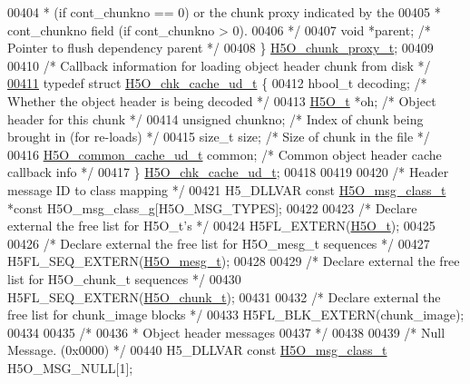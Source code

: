\begin{DoxyCode}
00404 \textcolor{comment}{     * (if cont\_chunkno == 0) or the chunk proxy indicated by the }
00405 \textcolor{comment}{     * cont\_chunkno field (if cont\_chunkno > 0).}
00406 \textcolor{comment}{     */}
00407     \textcolor{keywordtype}{void} *parent;                       \textcolor{comment}{/* Pointer to flush dependency parent */}
00408 \} \hyperlink{struct_h5_o__chunk__proxy__t}{H5O\_chunk\_proxy\_t};
00409 
00410 \textcolor{comment}{/* Callback information for loading object header chunk from disk */}
\hyperlink{struct_h5_o__chk__cache__ud__t}{00411} \textcolor{keyword}{typedef} \textcolor{keyword}{struct }\hyperlink{struct_h5_o__chk__cache__ud__t}{H5O\_chk\_cache\_ud\_t} \{
00412     hbool\_t decoding;                   \textcolor{comment}{/* Whether the object header is being decoded */}
00413     \hyperlink{struct_h5_o__t}{H5O\_t} *oh;                          \textcolor{comment}{/* Object header for this chunk */}
00414     \textcolor{keywordtype}{unsigned} chunkno;                   \textcolor{comment}{/* Index of chunk being brought in (for re-loads) */}
00415     \textcolor{keywordtype}{size\_t} size;                        \textcolor{comment}{/* Size of chunk in the file */}
00416     \hyperlink{struct_h5_o__common__cache__ud__t}{H5O\_common\_cache\_ud\_t} common;       \textcolor{comment}{/* Common object header cache callback info */}
00417 \} \hyperlink{struct_h5_o__chk__cache__ud__t}{H5O\_chk\_cache\_ud\_t};
00418 
00419 
00420 \textcolor{comment}{/* Header message ID to class mapping */}
00421 H5\_DLLVAR \textcolor{keyword}{const} \hyperlink{struct_h5_o__msg__class__t}{H5O\_msg\_class\_t} *\textcolor{keyword}{const} H5O\_msg\_class\_g[H5O\_MSG\_TYPES];
00422 
00423 \textcolor{comment}{/* Declare external the free list for H5O\_t's */}
00424 H5FL\_EXTERN(\hyperlink{struct_h5_o__t}{H5O\_t});
00425 
00426 \textcolor{comment}{/* Declare external the free list for H5O\_mesg\_t sequences */}
00427 H5FL\_SEQ\_EXTERN(\hyperlink{struct_h5_o__mesg__t}{H5O\_mesg\_t});
00428 
00429 \textcolor{comment}{/* Declare external the free list for H5O\_chunk\_t sequences */}
00430 H5FL\_SEQ\_EXTERN(\hyperlink{struct_h5_o__chunk__t}{H5O\_chunk\_t});
00431 
00432 \textcolor{comment}{/* Declare external the free list for chunk\_image blocks */}
00433 H5FL\_BLK\_EXTERN(chunk\_image);
00434 
00435 \textcolor{comment}{/*}
00436 \textcolor{comment}{ * Object header messages}
00437 \textcolor{comment}{ */}
00438 
00439 \textcolor{comment}{/* Null Message. (0x0000) */}
00440 H5\_DLLVAR \textcolor{keyword}{const} \hyperlink{struct_h5_o__msg__class__t}{H5O\_msg\_class\_t} H5O\_MSG\_NULL[1];

\end{DoxyCode}
